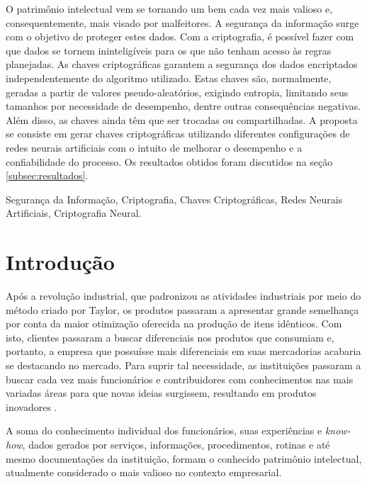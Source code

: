 \documentclass[a4paper,10pt,oneside,conference,final,keeplastbox]{inatel}
\begin{document}
    \begin{resumo}
        O patrimônio intelectual vem se tornando um bem cada vez mais valioso e, consequentemente, mais visado por malfeitores. A segurança da informação surge com o objetivo de proteger estes dados. Com a criptografia, é possível fazer com que dados se tornem ininteligíveis para os que não tenham acesso às regras planejadas. As chaves criptográficas garantem a segurança dos dados encriptados independentemente do algoritmo utilizado. Estas chaves são, normalmente, geradas a partir de valores pseudo-aleatórios, exigindo entropia, limitando seus tamanhos por necessidade de desempenho, dentre outras consequências negativas. Além disso, as chaves ainda têm que ser trocadas ou compartilhadas. A proposta se consiste em gerar chaves criptográficas utilizando diferentes configurações de redes neurais artificiais com o intuito de melhorar o desempenho e a confiabilidade do processo. Os resultados obtidos foram discutidos na seção \ref{subsec:resultados}.
        
    \end{resumo}
  
    \begin{palavraschave}
        Segurança da Informação, Criptografia, Chaves Criptográficas, Redes Neurais Artificiais, Criptografia Neural.
    \end{palavraschave}
  
    \section{Introdução}
  
        Após a revolução industrial, que padronizou as atividades industriais por meio do método criado por Taylor, os produtos passaram a apresentar grande semelhança por conta da maior otimização oferecida na produção de itens idênticos. Com isto, clientes passaram a buscar diferenciais nos produtos que consumiam e, portanto, a empresa que possuísse mais diferenciais em suas mercadorias acabaria se destacando no mercado. Para suprir tal necessidade, as instituições passaram a buscar cada vez mais funcionários e contribuidores com conhecimentos nas mais variadas áreas para que novas ideias surgissem, resultando em produtos inovadores \cite{thereza2002capital}.
    
        A soma do conhecimento individual dos funcionários, suas experiências e \textit{know-how}, dados gerados por serviços, informações, procedimentos, rotinas e até mesmo documentações da instituição, formam o conhecido patrimônio intelectual, atualmente considerado o mais valioso no contexto empresarial.
    
\end{document}
